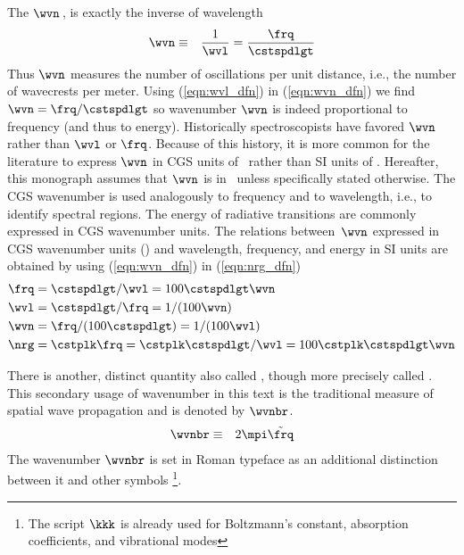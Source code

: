 \documentclass[12pt]{article}
\begin{document}
The  $\wvn$\,\xm, is exactly the inverse of wavelength 
\begin{eqnarray}
\wvn & \equiv & \frac{1}{\wvl} = \frac{\frq}{\cstspdlgt}
\label{eqn:wvn_dfn}
\end{eqnarray}
Thus $\wvn$ measures the number of oscillations per unit distance,
i.e., the number of wavecrests per meter.
Using (\ref{eqn:wvl_dfn}) in (\ref{eqn:wvn_dfn}) we find 
$\wvn = \frq/\cstspdlgt$ so wavenumber $\wvn$ is indeed proportional
to frequency (and thus to energy). 
Historically spectroscopists have favored $\wvn$ rather than $\wvl$
or $\frq$.
Because of this history, it is more common for the literature to
express $\wvn$ in CGS units of \xcm\ rather than SI units of \xm.
Hereafter, this monograph assumes that $\wvn$ is in \xcm\ unless
specifically stated otherwise.
The CGS wavenumber is used analogously to frequency and to wavelength,
i.e., to identify spectral regions.
The energy of radiative transitions are commonly expressed in CGS
wavenumber units. 
The relations between~$\wvn$ expressed in CGS wavenumber units (\xcm)
and wavelength, frequency, and energy in SI units are obtained by
using (\ref{eqn:wvn_dfn}) in (\ref{eqn:nrg_dfn})
\begin{subequations}
\label{eqn:nrg_wvn_wvl}
\begin{align}
\label{eqn:nrg_wvn_dfn}
\frq & = \cstspdlgt / \wvl = 100 \cstspdlgt \wvn \\
\wvl & = \cstspdlgt / \frq = 1 / ( 100 \wvn ) \\
\wvn & = \frq / ( 100 \cstspdlgt ) = 1 / ( 100 \wvl ) \\
\nrg & = \cstplk \frq = \cstplk \cstspdlgt / \wvl = 100 \cstplk \cstspdlgt \wvn
\end{align}
\end{subequations}

There is another, distinct quantity also called ,
though more precisely called .
This secondary usage of wavenumber in this text is the traditional
measure of spatial wave propagation and is denoted by $\wvnbr$. 
\begin{eqnarray}
\wvnbr & \equiv & 2\mpi \tilde{\frq}
\label{eqn:wvnbr_dfn}
\end{eqnarray}
The wavenumber $\wvnbr$ is set in Roman typeface as an additional
distinction between it and other symbols
\footnote{The script $\kkk$ is already used for Boltzmann's constant, 
absorption coefficients, and vibrational modes}.
\end{document}
